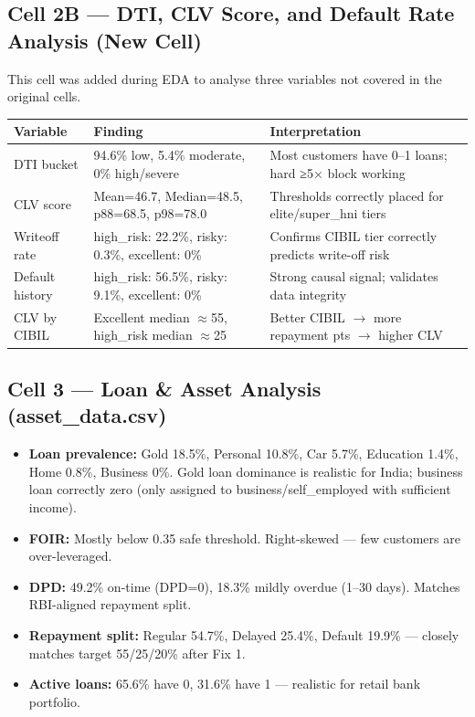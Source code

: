 \documentclass[12pt,a4paper]{article}
\begin{document}
\subsection{Cell 2B — DTI, CLV Score, and Default Rate Analysis (New Cell)}

This cell was added during EDA to analyse three variables not covered in the original cells.

\begin{tabular}{lll}
\toprule
\textbf{Variable} & \textbf{Finding} & \textbf{Interpretation} \\
\midrule
DTI bucket       & 94.6\% low, 5.4\% moderate, 0\% high/severe & Most customers have 0--1 loans; hard ≥5× block working \\
CLV score        & Mean=46.7, Median=48.5, p88=68.5, p98=78.0  & Thresholds correctly placed for elite/super\_hni tiers \\
Writeoff rate    & high\_risk: 22.2\%, risky: 0.3\%, excellent: 0\% & Confirms CIBIL tier correctly predicts write-off risk \\
Default history  & high\_risk: 56.5\%, risky: 9.1\%, excellent: 0\%  & Strong causal signal; validates data integrity \\
CLV by CIBIL    & Excellent median $\approx$55, high\_risk median $\approx$25   & Better CIBIL $\rightarrow$ more repayment pts $\rightarrow$ higher CLV \\
\bottomrule
\end{tabular}

\subsection{Cell 3 — Loan \& Asset Analysis (asset\_data.csv)}

\begin{itemize}[leftmargin=*,itemsep=2pt]
  \item \textbf{Loan prevalence:} Gold 18.5\%, Personal 10.8\%, Car 5.7\%, Education 1.4\%, Home 0.8\%, Business 0\%. Gold loan dominance is realistic for India; business loan correctly zero (only assigned to business/self\_employed with sufficient income).
  \item \textbf{FOIR:} Mostly below 0.35 safe threshold. Right-skewed — few customers are over-leveraged.
  \item \textbf{DPD:} 49.2\% on-time (DPD=0), 18.3\% mildly overdue (1--30 days). Matches RBI-aligned repayment split.
  \item \textbf{Repayment split:} Regular 54.7\%, Delayed 25.4\%, Default 19.9\% — closely matches target 55/25/20\% after Fix 1.
  \item \textbf{Active loans:} 65.6\% have 0, 31.6\% have 1 — realistic for retail bank portfolio.
\end{itemize}
\end{document}

